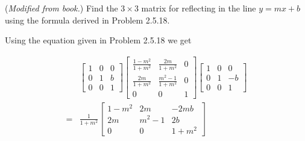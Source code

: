 \documentclass[../main.tex]{subfiles}
\begin{document}
(\emph{Modified from book.})
Find the $3\times3$ matrix for reflecting in the line $y = mx + b$ using the formula derived in Problem 2.5.18.

\solution

Using the equation given in Problem 2.5.18 we get

\begin{align*}
   &\begin{bmatrix}
      1&0&0\\
      0&1&b\\
      0&0&1
    \end{bmatrix}
    \begin{bmatrix}
      \frac{1-m^2}{1+m^2}&\frac{2m}{1+m^2}&0\\
      \frac{2m}{1+m^2}&\frac{m^2-1}{1+m^2}&0\\
      0&0&1
    \end{bmatrix}
    \begin{bmatrix}
      1&0&0\\
      0&1&-b\\
      0&0&1
    \end{bmatrix}
	\\=&
    \frac{1}{1+m^2}
    \begin{bmatrix}
      1-m^2 & 2m & -2mb\\
      2m & m^2-1 & 2b\\
      0&0&1+m^2
    \end{bmatrix}
\end{align*}
\end{document}
